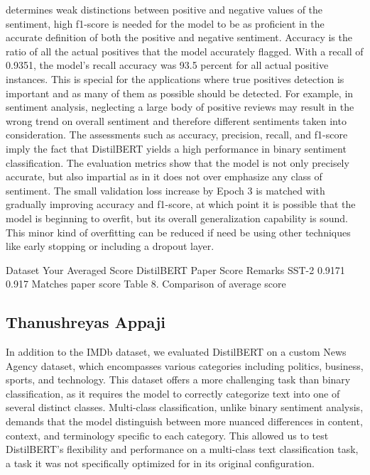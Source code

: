 \documentclass[
  11pt,
]{article}
\begin{document}
determines weak distinctions between positive and negative values of the
sentiment, high f1-score is needed for the model to be as proficient in
the accurate definition of both the positive and negative sentiment.
Accuracy is the ratio of all the actual positives that the model
accurately flagged. With a recall of 0.9351, the model's recall accuracy
was 93.5 percent for all actual positive instances. This is special for
the applications where true positives detection is important and as many
of them as possible should be detected. For example, in sentiment
analysis, neglecting a large body of positive reviews may result in the
wrong trend on overall sentiment and therefore different sentiments
taken into consideration. The assessments such as accuracy, precision,
recall, and f1-score imply the fact that DistilBERT yields a high
performance in binary sentiment classification. The evaluation metrics
show that the model is not only precisely accurate, but also impartial
as in it does not over emphasize any class of sentiment. The small
validation loss increase by Epoch 3 is matched with gradually improving
accuracy and f1-score, at which point it is possible that the model is
beginning to overfit, but its overall generalization capability is
sound. This minor kind of overfitting can be reduced if need be using
other techniques like early stopping or including a dropout layer.

Dataset Your Averaged Score DistilBERT Paper Score Remarks SST-2 0.9171
0.917 Matches paper score Table 8. Comparison of average score

\subsection{Thanushreyas Appaji}\label{muhammed-umer-bashir}

In addition to the IMDb dataset, we evaluated DistilBERT on a custom News Agency dataset, which encompasses various categories including politics, business, sports, and technology. This dataset offers a more challenging task than binary classification, as it requires the model to correctly categorize text into one of several distinct classes. Multi-class classification, unlike binary sentiment analysis, demands that the model distinguish between more nuanced differences in content, context, and terminology specific to each category. This allowed us to test DistilBERT’s flexibility and performance on a multi-class text classification task, a task it was not specifically optimized for in its original configuration.
\end{document}
